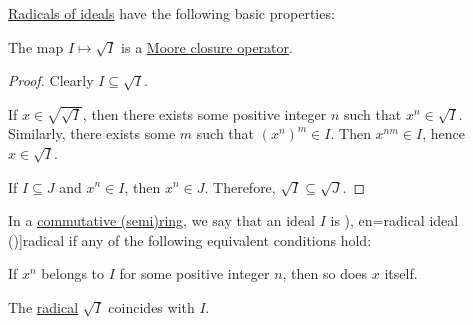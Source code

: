 \begin{proposition}\label{thm:def:radical_of_ideal}
  \hyperref[def:radical_of_ideal]{Radicals of ideals} have the following basic properties:
  \begin{thmenum}
     The map \( I \mapsto \sqrt I \) is a \hyperref[def:moore_closure_operator]{Moore closure operator}.
  \end{thmenum}
\end{proposition}
\begin{proof}
   Clearly \( I \subseteq \sqrt I \).

   If \( x \in \sqrt {\sqrt I} \), then there exists some positive integer \( n \) such that \( x^n \in \sqrt I \). Similarly, there exists some \( m \) such that \( (x^n)^m \in I \). Then \( x^{nm} \in I \), hence \( x \in \sqrt I \).

   If \( I \subseteq J \) and \( x^n \in I \), then \( x^n \in J \). Therefore, \( \sqrt I \subseteq \sqrt J \).
\end{proof}

\begin{definition}\label{def:radical_ideal}
  In a \hyperref[def:ring/commutative]{commutative (semi)ring}, we say that an ideal \( I \) is \term[ru=радикал (\cite[406]{Винберг2014КурсАлгебры}), en=radical ideal (\cite[def. VII.2.13]{Aluffi2009Algebra})]{radical} if any of the following equivalent conditions hold:
  \begin{thmenum}
    \mimprovised If \( x^n \) belongs to \( I \) for some positive integer \( n \), then so does \( x \) itself.

     The \hyperref[def:radical_of_ideal]{radical} \( \sqrt I \) coincides with \( I \).
  \end{thmenum}
\end{definition}

